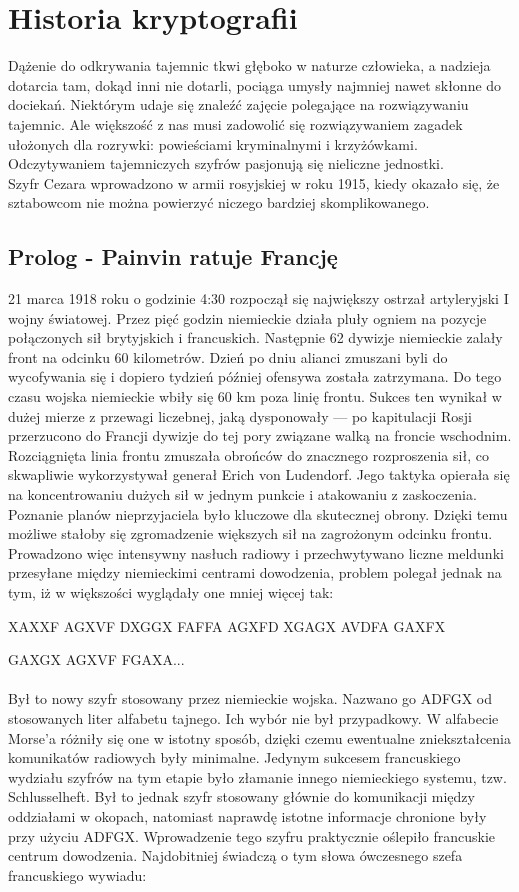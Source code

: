 \documentclass[10pt, a4paper, titlepage]{article}
\begin{document}
\section{Historia kryptografii}
Dążenie do odkrywania tajemnic tkwi głęboko w naturze człowieka, a nadzieja dotarcia tam, dokąd inni nie dotarli, pociąga umysły najmniej nawet skłonne do dociekań. Niektórym udaje się znaleźć zajęcie polegające na rozwiązywaniu tajemnic. Ale większość z nas musi zadowolić się rozwiązywaniem zagadek ułożonych dla rozrywki: powieściami kryminalnymi i krzyżówkami. Odczytywaniem tajemniczych szyfrów pasjonują się nieliczne jednostki.\\
Szyfr Cezara wprowadzono w armii rosyjskiej w roku 1915, kiedy okazało się, że sztabowcom nie
można powierzyć niczego bardziej skomplikowanego.
\subsection{Prolog - Painvin ratuje Francję}
21 marca 1918 roku o godzinie 4:30 rozpoczął się największy ostrzał artyleryjski I wojny światowej. Przez pięć godzin niemieckie działa pluły ogniem na pozycje połączonych sił brytyjskich i francuskich. Następnie 62 dywizje niemieckie zalały front na odcinku 60 kilometrów. Dzień po dniu alianci zmuszani byli do wycofywania się i dopiero tydzień później ofensywa została zatrzymana. Do tego czasu wojska niemieckie wbiły się 60 km poza linię frontu. Sukces ten wynikał w dużej mierze z przewagi liczebnej, jaką dysponowały — po kapitulacji Rosji przerzucono do Francji dywizje do tej pory związane walką na froncie wschodnim. Rozciągnięta linia frontu zmuszała obrońców do znacznego rozproszenia sił, co skwapliwie wykorzystywał generał Erich von Ludendorf. Jego taktyka opierała się na koncentrowaniu dużych sił w jednym punkcie i atakowaniu z zaskoczenia. Poznanie planów nieprzyjaciela było kluczowe dla skutecznej obrony. Dzięki temu możliwe stałoby się zgromadzenie większych sił na zagrożonym odcinku frontu. Prowadzono więc intensywny nasłuch radiowy i przechwytywano liczne meldunki przesyłane między niemieckimi centrami dowodzenia, problem polegał jednak na tym, iż w większości wyglądały one mniej więcej tak:\\
\par XAXXF AGXVF DXGGX FAFFA AGXFD XGAGX AVDFA GAXFX
\par GAXGX AGXVF FGAXA...\\
\\
Był to nowy szyfr stosowany przez niemieckie wojska. Nazwano go ADFGX od stosowanych liter alfabetu tajnego. Ich wybór nie był przypadkowy. W alfabecie Morse'a różniły się one w istotny sposób, dzięki czemu ewentualne zniekształcenia komunikatów radiowych były minimalne. Jedynym sukcesem francuskiego wydziału szyfrów na tym etapie było złamanie innego niemieckiego systemu, tzw. Schlusselheft. Był to jednak szyfr stosowany głównie do komunikacji między oddziałami w okopach, natomiast naprawdę istotne informacje chronione były przy użyciu ADFGX. Wprowadzenie tego szyfru praktycznie oślepiło francuskie centrum dowodzenia. Najdobitniej świadczą o tym słowa ówczesnego szefa francuskiego wywiadu:\\
\end{document}
